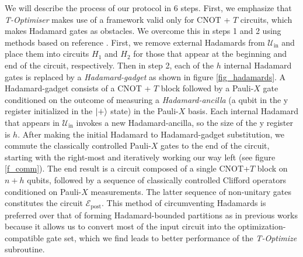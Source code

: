 \documentclass[notitlepage]{article}
\theoremstyle{definition}
\theoremstyle{problem}
\theoremstyle{lemma}
\begin{document}
We will describe the process of our protocol in 6 steps. First, we emphasize that \emph{T-Optimiser} makes use of a framework valid only for CNOT + $T$ circuits, which makes Hadamard gates as obstacles. We overcome this in steps 1 and 2 using methods based on reference \cite{1_Montanaro_2017}. First, we remove external Hadamards
from $\mathcal{U}_{\text{in}}$ and place them into circuits $H_1$ and $H_2$ for those that appear at the beginning and end of the circuit, respectively. Then in step 2, each of the $h$ internal Hadamard gates is replaced by a \emph{Hadamard-gadget} as shown in figure \ref{fig_hadamards}. A Hadamard-gadget consists of a CNOT + $T$ block followed by a Pauli-$X$ gate conditioned on the outcome of measuring a \emph{Hadamard-ancilla} (a qubit in the y register initialized in the $\left\vert{+}\right\rangle$ state) in the Pauli-$X$ basis. Each internal Hadamard that appears in $\mathcal{U}_{\text{in}}$ invokes a new Hadamard-ancilla, so the size of the y register is $h$. After making the initial Hadamard to Hadamard-gadget substitution, we commute the classically controlled Pauli-$X$ gates to the end of the circuit, starting with the right-most and iteratively working our way left  (see figure \ref{f_comm}). The end result is a circuit composed of a single CNOT+$T$ block on $n+h$ qubits, followed by a sequence of classically controlled Clifford operators conditioned on Pauli-$X$ measurements. The latter sequence of non-unitary gates constitutes the circuit $\mathcal{E}_{\text{post}}$. This method of circumventing Hadamards is preferred over that of forming Hadamard-bounded partitions as in previous works \cite{6_Amy_2013} because it allows us to convert most of the input circuit into the optimization-compatible gate set, which we find leads to better performance of the \emph{T-Optimize} subroutine.
\end{document}

